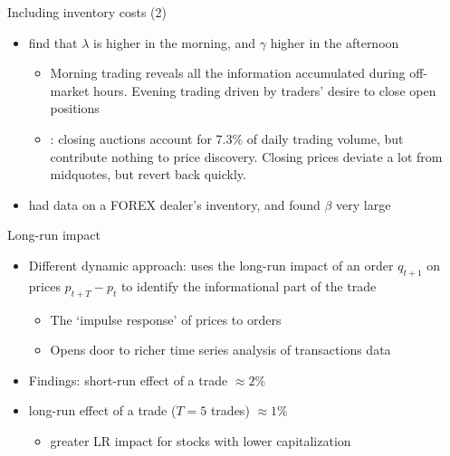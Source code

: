 \documentclass[english,10pt
,aspectratio=169
]{beamer}
\begin{document}
\begin{frame}{Including inventory costs (2)}
		\begin{itemize}
			\item \textbf{\citet*{madhavan_why_1997}} find that $\lambda$ is higher in the morning, and $\gamma$ higher in the afternoon
			\begin{itemize}
				\item Morning trading reveals all the information accumulated during off-market hours. Evening trading driven by traders' desire to close open positions
				\item \textbf{\cite{bogousslavsky_should_2020}}: closing auctions account for $7.3\%$ of daily trading volume, but contribute nothing to price discovery. Closing prices deviate a lot from midquotes, but revert back quickly.
			\end{itemize}
			\item \textbf{\cite{lyons_tests_1995}} had data on a FOREX dealer's inventory, and found $\beta$ very large
		\end{itemize}
\end{frame}


\begin{frame}{Long-run impact}
	\begin{itemize}
		\item Different dynamic approach: \textbf{\cite{hasbrouck_measuring_1991}} uses the long-run impact of an order $q_{t+1}$ on prices $p_{t+T}-p_t$ to identify the informational part of the trade
		\begin{itemize}
			\item The `impulse response' of prices to orders
			\item Opens door to richer time series analysis of transactions data
		\end{itemize}
		\item Findings: short-run effect of a trade $\approx 2\%$
		\item long-run effect of a trade ($T=5$ trades) $\approx 1\%$
		\begin{itemize}
			\item greater LR impact for stocks with lower capitalization
		\end{itemize}
	\end{itemize}
\end{frame}
\end{document}
